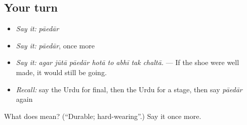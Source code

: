 \subsection*{Your turn}
\begin{itemize}
\raggedright
  \item \emph{Say it:} \emph{pāedār}
  \item \emph{Say it:} \emph{pāedār}, once more
  \item \emph{Say it:} \emph{agar jūtā pāedār hotā to abhī tak chaltā.} — If the shoe were well made, it would still be going.
  \item \emph{Recall:} say the Urdu for final, then the Urdu for a stage, then say \emph{pāedār} again
\end{itemize}

\begin{tcolorbox}[breakable,colback=teal!4,colframe=teal!35!black,title={Before you move on}]
What does  mean? (\textquotedblleft{}Durable; hard-wearing\textquotedblright{}.) Say it once more.
\end{tcolorbox}

